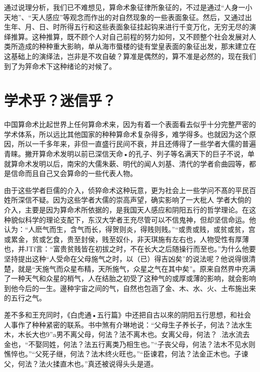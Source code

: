 {{通过说理分析，我们已不难想见，算命术象征律所象征的，不过是通过“人身一小天地”、“天人感应”等观念而作出的对自然现象的一些表面象征。然后，又通过出生年、月、日、时所得五行和这些表面象征挂起钩来进行千变万化，无穷无尽的演绎推算。这种推算，既不顾个人对自己前程的努力如何，又不顾整个社会发展对人类所造成的种种重大影晌，单从海市蜃楼的徒有堂皇表面的象征出发，那末建立在这基础上的演绎法，岂非是不攻自破？算准是偶然的，算不准是必然的，现在我们到了为笄命术下这种绪论的对候了。

\section{学术乎？迷信乎？}
中国算命术比起世界上任何算命术来，因为有着一个表面看去似乎十分完整严密的学术体系，所以远比其他国家的种种算命术复杂得多，难学得多。也就因为这个原因，所以一千多年来，非但一直盛行民间不衰，并且还傅得了一些学者大儒的普遍青睐。撇开算命术发明以前已深信天命•的孔子、列子等名满天下的巨子不说，单就算命术发明以后，南宋的大儒朱蔌、明代的闻人刘基、清代的学者俞曲园等，都是信命而且自己又会算命的一些代表人物。

由于这些学者巨儒的介入，侦猝命术这种玩意，更为社会上一些学问不髙的平民百姓所深信不疑。因为这些学者大儒的崇高声望，确实影响了一大枇人    学者大倘的介入，主要是因为算命术所依据的，是我国天人感应和阴阳五行的哲学理论。在这种貌似科学的理论支配下，东汉大学者王充尽管可以不信鬼神，但却坚信命运。他认为：“人麽气而生，含气而长，得贺则炎，得贱则贱。”“或贵或贱，或贫或贫，宫或累金，贫或乞食，贵至封侯，贱至奴仆，非天琪施有左右也，人物受性有厚薄也，并JTf言：“富贵贫贱皆在初拔之时，不在长大之后随操行而至也。”为什么他要坚持提出这种“人受命在父母施气之时，以（已）得吉凶矣”的说法呢？他说得很清楚，就是“天施气而众星布精，天所施气，众星之气在其中矣”。原来自然界中充满了一种天气和众星的梢气，人在结胎之初受了这种气的或厚或薄的影响，就会影响到他今后的一生。邊种宇宙之间的气，自然也包涵了金、木、水、火、土布施出来的五行之气。

差不多和王充同时，《白虎通•五行篇》中还把自古以來的阴阳五行思想，和社会人事作了种种紧密的联系。书中煞有介琳地说：“父母生子养长子，何法？法水生木，木长大也9”a男不离父母，何法？法不离木也。女离父母，何法？
.法水流去金也，“不娶同姓，何法？法五行离类乃相生也。”“子丧父母，何法？法木不见水则憔悴也。”“父死子继，何法？法木终火旺也。”“臣谏君，何法？法金正木也。子谏父，何法？法火揉直木也。”真还被说得头头是道。

}}
